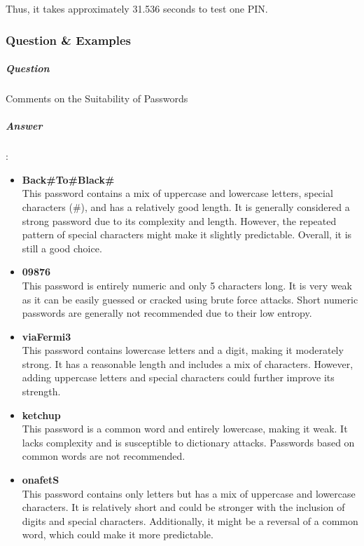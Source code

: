 \documentclass{article}
\begin{document}
                            Thus, it takes approximately 31.536 seconds to test one PIN.
                  \subsubsection{Question \& Examples}
                            \subparagraph{Question} Comments on the Suitability of Passwords
                            \subparagraph{Answer}:    
                                       
                        \begin{itemize}
                            \item \textbf{Back\#To\#Black\#} \\
                            This password contains a mix of uppercase and lowercase letters, special characters (\#), and has a relatively good length. It is generally considered a strong password due to its complexity and length. However, the repeated pattern of special characters might make it slightly predictable. Overall, it is still a good choice.

                            \item \textbf{09876} \\
                            This password is entirely numeric and only 5 characters long. It is very weak as it can be easily guessed or cracked using brute force attacks. Short numeric passwords are generally not recommended due to their low entropy.

                            \item \textbf{viaFermi3} \\
                            This password contains lowercase letters and a digit, making it moderately strong. It has a reasonable length and includes a mix of characters. However, adding uppercase letters and special characters could further improve its strength.

                            \item \textbf{ketchup} \\
                            This password is a common word and entirely lowercase, making it weak. It lacks complexity and is susceptible to dictionary attacks. Passwords based on common words are not recommended.

                            \item \textbf{onafetS} \\
                            This password contains only letters but has a mix of uppercase and lowercase characters. It is relatively short and could be stronger with the inclusion of digits and special characters. Additionally, it might be a reversal of a common word, which could make it more predictable.


\end{itemize}
\end{document}
